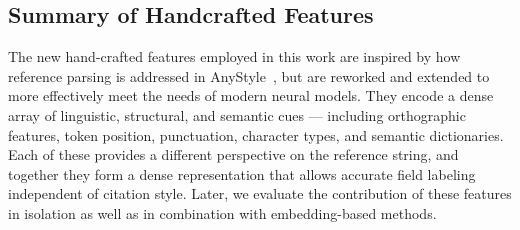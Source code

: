 \subsection*{Summary of Handcrafted Features}
The new hand-crafted features employed in this work are inspired by how reference parsing is addressed in AnyStyle~\cite{anystyle}, but are reworked and extended to more effectively meet the needs of modern neural models. They encode a dense array of linguistic, structural, and semantic cues — including orthographic features, token position, punctuation, character types, and semantic dictionaries. Each of these provides a different perspective on the reference string, and together they form a dense representation that allows accurate field labeling independent of citation style. Later, we evaluate the contribution of these features in isolation as well as in combination with embedding-based methods.
\renewcommand{\arraystretch}{1.3}
